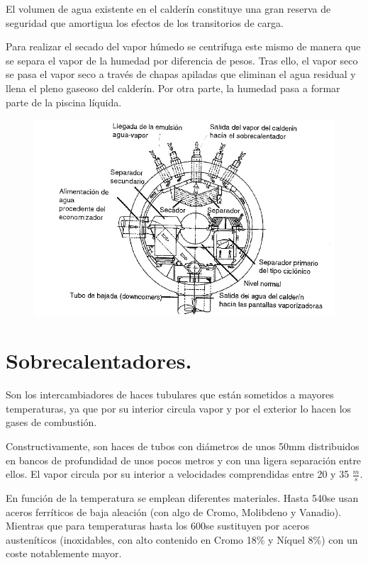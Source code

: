 El volumen de agua existente en el calderín constituye una gran reserva de
seguridad que amortigua los efectos de los transitorios de carga.



Para realizar el secado del vapor húmedo se centrifuga este mismo de manera que se separa el vapor de la humedad por diferencia de pesos. Tras ello, el vapor seco se pasa el vapor seco a través de chapas apiladas que eliminan el agua residual y llena el pleno gaseoso del calderín. Por otra parte, la humedad pasa a formar parte de la piscina líquida.
\begin{figure}[H]
	\centering
	\includegraphics[width=0.7\linewidth]{res/tema10/calderin}
	\label{fig:calderin}
\end{figure}

\section{Sobrecalentadores.}
Son los intercambiadores de haces tubulares que están sometidos a mayores temperaturas,
ya que por su interior circula vapor  y por el
exterior lo hacen los gases de combustión.




Constructivamente, son haces de tubos con diámetros de unos 50mm distribuidos en bancos de profundidad de unos pocos metros y con una ligera separación entre ellos. El vapor circula por su interior a velocidades comprendidas entre 20 y 35 $\frac{m}{s}$.





En función de la temperatura se emplean diferentes materiales. Hasta 540\grado se usan aceros ferríticos de baja aleación (con algo de Cromo, Molibdeno y
Vanadio). Mientras que para temperaturas hasta los 600\grado se sustituyen por aceros austeníticos
(inoxidables, con alto contenido en Cromo 18\% y Níquel 8\%) con un coste notablemente
mayor.




